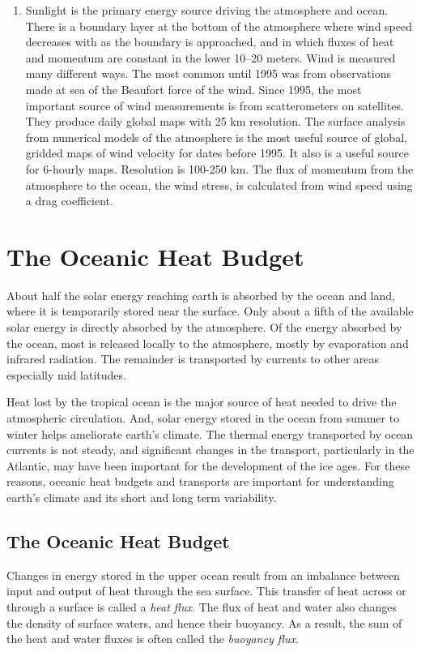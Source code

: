 \begin{enumerate}
\item
Sunlight is the primary energy source driving the atmosphere and
ocean.
\vitem
There is a boundary layer at the bottom of the atmosphere where wind
speed decreases with as the boundary is approached, and in which
fluxes of heat and momentum are constant in the lower 10--20 meters.
\vitem
Wind is measured many different ways. The most common until 1995 was
from observations made at sea of the Beaufort
force of the wind.
\vitem
Since 1995, the most important source of wind measurements is from
scatterometers
on satellites. They produce daily global maps with 25 km resolution.
\vitem
The surface analysis from numerical models of the
atmosphere is the most
useful source of global, gridded maps of wind velocity for dates
before 1995. It also is a useful source for 6-hourly maps. Resolution
is 100-250 km.
\vitem
The flux of momentum from the atmosphere to the ocean, the wind
stress, is calculated from wind speed using a drag
coefficient.
\end{enumerate}


\chapter{The Oceanic Heat Budget}
About half the solar energy reaching earth is absorbed by the ocean
and land, where it is temporarily stored near the surface. Only about
a fifth of the available solar energy is directly absorbed by the
atmosphere. Of the energy absorbed by the ocean, most is released
locally to the atmosphere, mostly by evaporation and infrared
radiation. The remainder is transported by
currents to other areas especially mid latitudes.

Heat lost by the tropical ocean is the major source of heat needed to
drive the atmospheric circulation.  And, solar energy stored in the
ocean from summer to winter helps ameliorate earth's climate. The
thermal energy transported by ocean currents is not steady, and
significant changes in the transport, particularly in the Atlantic,
may have been important for the development of the ice ages. For these
reasons, oceanic heat budgets and transports are important for
understanding earth's climate and its short and long term variability.

\section{The Oceanic Heat Budget}
Changes in energy stored in the upper ocean
result from an imbalance between input and output of heat through the
sea surface. This transfer of heat across or through a surface is
called a \textit{heat flux}. The flux of heat
and water also changes the density of surface waters, and hence their
buoyancy. As a result, the sum of the heat and water fluxes is often
called the \textit{buoyancy flux}.

